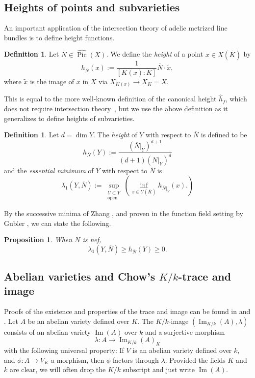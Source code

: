 \documentclass[times, doublespace]{amsart}
\numberwithin{equation}{section}
\theoremstyle{plain}
\newtheorem{proposition}[equation]{Proposition}
\theoremstyle{definition}
\newtheorem{definition}[equation]{Definition}
\DeclareMathOperator{\Pic}{Pic}
\renewcommand{\Im}{\operatorname{Im}}
\begin{document}
\subsection{Heights of points and subvarieties}
An important application of the intersection theory of adelic metrized line bundles is to define height functions. 

\begin{definition}
Let $\overline N\in\widehat{\Pic}(X)$. We define the \emph{height} of a point $x\in X(\overline K)$ by
\[h_{\overline N}(x):=\frac1{[K(x):K]}\overline N\cdot \tilde x,\]
where $\tilde x$ is the image of $x$ in $X$ via $X_{K(x)}\to X_K=X$.
\end{definition}

This is equal to the more well-known definition of the canonical height $\widehat{h}_f$, which does not require intersection theory~\cite{CS,heights}, but we use the above definition as it generalizes to define heights of subvarieties.


\begin{definition}
Let $d=\dim Y$. The \emph{height} of $Y$ with respect to $\overline N$ is defined to be
\[h_{\overline N}(Y):=\frac{\left(\overline N|_Y\right)^{d+1}}{(d+1)\left(N|_Y\right)^{d}}\]
and the \emph{essential minimum} of $Y$ with respect to $\overline N$ is
\[\lambda_1(Y,\overline N):=\sup_{\substack{U\subset Y \\ \text{open}}}\left(\inf_{x\in U(\overline K)} h_{\overline N|_Y}(x).\right)\]
\end{definition}

By the successive minima of Zhang \cite[Theorem 1.1]{Z95}, and proven in the function field setting by Gubler \cite[Theorem 4.1]{G07}, we can state the following.
\begin{proposition}\label{successiveminima}
When $\overline N$ is nef,
\[\lambda_1(Y,\overline N)\ge h_{\overline N}(Y)\ge0.\]
\end{proposition}







\subsection{Abelian varieties and Chow's $K/k$-trace and image}\label{tracesubsection}

Proofs of the existence and properties of the trace and image can be found in \cite{langab} and \cite{conradtrace}. Let $A$ be an abelian variety defined over $K$. The $K/k$-image $\left(\Im_{K/k}(A),\lambda\right)$ consists of an abelian variety $\Im(A)$ over $k$ and a surjective morphism 
\[\lambda:A\longrightarrow\Im_{K/k}(A)_K\]
with the following universal property: If $V$ is an abelian variety defined over $k$, and $\phi:A\to V_K$ a morphism, then $\phi$ factors through $\lambda$. Provided the fields $K$ and $k$ are clear, we will often drop the $K/k$ subscript and just write $\Im(A)$. 
\end{document}

